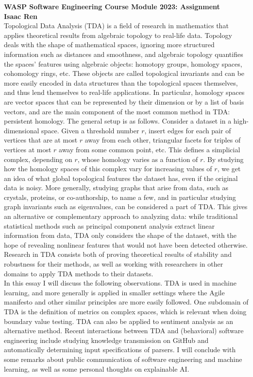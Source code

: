 \documentclass[11pt, oneside]{article}
\begin{document}
\noindent\textbf{WASP Software Engineering Course Module 2023: Assignment} \\
\textbf{Isaac Ren}\\

Topological Data Analysis (TDA) is a field of research in mathematics that applies theoretical results from algebraic topology to real-life data. Topology deals with the shape of mathematical spaces, ignoring more structured information such as distances and smoothness, and algebraic topology quantifies the spaces’ features using algebraic objects: homotopy groups, homology spaces, cohomology rings, etc. These objects are called topological invariants and can be more easily encoded in data structures than the topological spaces themselves, and thus lend themselves to real-life applications.
In particular, homology spaces are vector spaces that can be represented by their dimension or by a list of basis vectors, and are the main component of the most common method in TDA: persistent homology. The general setup is as follows. Consider a dataset in a high-dimensional space. Given a threshold number $r$, insert edges for each pair of vertices that are at most $r$ away from each other, triangular facets for triples of vertices at most $r$ away from some common point, etc. This defines a simplicial complex, depending on $r$, whose homology varies as a function of $r$. By studying how the homology spaces of this complex vary for increasing values of $r$, we get an idea of what global topological features the dataset has, even if the original data is noisy.
More generally, studying graphs that arise from data, such as crystals, proteins, or co-authorship, to name a few, and in particular studying graph invariants such as eigenvalues, can be considered a part of TDA.
This gives an alternative or complementary approach to analyzing data: while traditional statistical methods such as principal component analysis extract linear information from data, TDA only considers the shape of the dataset, with the hope of revealing nonlinear features that would not have been detected otherwise. Research in TDA consists both of proving theoretical results of stability and robustness for their methods, as well as working with researchers in other domains to apply TDA methods to their datasets.\\

In this essay I will discuss the following observations. TDA is used in machine learning, and more generally is applied in smaller settings where the Agile manifesto and other similar principles are more easily followed. One subdomain of TDA is the definition of metrics on complex spaces, which is relevant when doing boundary value testing. TDA can also be applied to sentiment analysis as an alternative method. Recent interactions between TDA and (behavioral) software engineering include studying knowledge transmission on GitHub and automatically determining input specifications of parsers. I will conclude with some remarks about public communication of software engineering and machine learning, as well as some personal thoughts on explainable AI.\\
\end{document}
